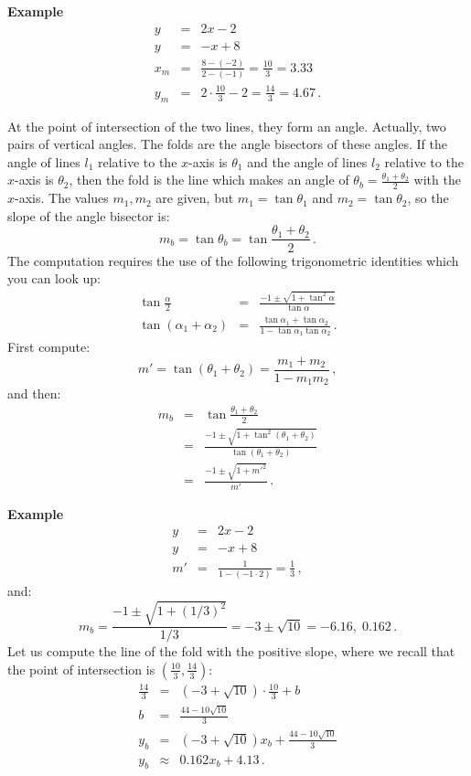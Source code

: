 \documentclass[11pt,a4paper]{article}
\newcommand*{\disfrac}[2]{\displaystyle\frac{#1}{#2}}
\newenvironment{form}[1]{%
\begin{displaymath}%
\renewcommand{\arraystretch}{#1}%
\begin{array}{lcl}}%
{\end{array}%
\end{displaymath}%
}
\begin{document}
\textbf{Example}
\begin{form}{1.5}
y&=&2x-2\\
y &=& -x+8\\
x_m&=&\disfrac{8-(-2)}{2-(-1)}=\disfrac{10}{3}=3.33\\
y_m &=& 2\cdot\disfrac{10}{3}-2=\disfrac{14}{3}=4.67\,.
\end{form}

At the point of intersection of the two lines, they form an angle. Actually, two pairs of vertical angles. The folds are the angle bisectors of these angles. If the angle of lines $l_1$ relative to the $x$-axis is $\theta_1$ and the angle of lines $l_2$ relative to the $x$-axis is $\theta_2$, then the fold is the line which makes an angle of $\theta_b=\disfrac{\theta_1+\theta_2}{2}$ with the $x$-axis. The values $m_1,m_2$ are given, but $m_1=\tan\theta_1$ and $m_2=\tan\theta_2$, so the slope of the angle bisector is:
\[
m_b=\tan\theta_b=\tan\disfrac{\theta_1+\theta_2}{2}\,.
\]
The computation requires the use of the following trigonometric identities which you can look up:
\begin{form}{1.5}
\tan \disfrac{\alpha}{2}&=& \disfrac{-1\pm\sqrt{1+\tan^2\alpha}}{\tan \alpha}\\
\tan(\alpha_1+\alpha_2)&=& \disfrac{\tan\alpha_1+\tan\alpha_2}{1-\tan\alpha_1\tan\alpha_2}\,.
\end{form}
First compute:
\[
m'=\tan(\theta_1+\theta_2)= \disfrac{m_1+m_2}{1-m_1m_2}\,,
\]
and then:
\begin{form}{1.5}
m_b&=& \tan\disfrac{\theta_1+\theta_2}{2}\\
&=&\disfrac{-1\pm\sqrt{1+\tan^2(\theta_1+\theta_2)}}{\tan (\theta_1+\theta_2)}\\
&=&\disfrac{-1\pm\sqrt{1+m'^2}}{m'}\,.
\end{form}

\textbf{Example}
\begin{form}{1.5}
y&=&2x-2\\
y &=& -x+8\\
m'&=&\disfrac{1}{1-(-1\cdot 2)}=\disfrac{1}{3}\,,
\end{form}
and:
\[
m_b=\disfrac{-1\pm\sqrt{1+(1/3)^2}}{1/3}=-3\pm \sqrt{10}=-6.16,\; 0.162\,.
\]
Let us compute the line of the fold with the positive slope, where we recall that the point of intersection is $\left(\disfrac{10}{3},\disfrac{14}{3}\right)$:
\begin{form}{1.5}
\disfrac{14}{3} &=& (-3+\sqrt{10}) \cdot \disfrac{10}{3} + b\\ b&=&\disfrac{44-10\sqrt{10}}{3}\\
y_b &=& (-3+\sqrt{10})x_b + \disfrac{44-10\sqrt{10}}{3}\\
y_b&\approx&0.162x_b+4.13\,.
\end{form}
\end{document}

